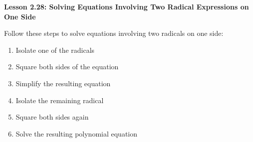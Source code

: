 \begin{center}
\textbf{Lesson 2.28: Solving Equations Involving Two Radical Expressions on One Side}
\end{center}

\vspace*{1ex}

\noindent Follow these steps to solve equations involving two radicals on one side:
\begin{enumerate}[noitemsep, label = \color{blue}\arabic*. ]
    \item Isolate one of the radicals     
    \item Square both sides of the equation 
    \item Simplify the resulting equation  
    \item Isolate the remaining radical  
    \item Square both sides again  
    \item Solve the resulting polynomial equation  
\end{enumerate}

